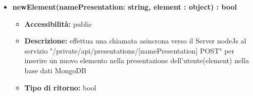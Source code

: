{{\begin{itemize}
		\item \textbf{newElement(namePresentation: string, element : object) : bool}
			\begin{itemize}
			\item \textbf{Accessibilit\`{a}:} public
			\item \textbf{Descrizione:} effettua una chiamata asincrona verso il Server nodeJs al servizio "/private/api/presentations/[namePresentation] POST" per inserire un nuovo elemento nella presentazione dell'utente(element) nella base dati MongoDB
 			\item \textbf{Tipo di ritorno:} bool
			\end{itemize}

		\end{itemize}
	}
}
	
	
	
	
	
	
	
	
	
	
	
	
	
	
	